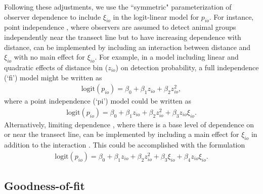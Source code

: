 \documentclass[aoas,preprint]{imsart}
\numberwithin{equation}{section}
\theoremstyle{plain}
\begin{document}
Following these adjustments, we use the ``symmetric" parameterization \citep{MacKenzieClement2016} of observer dependence to include $\xi_{io}$ in the logit-linear model for $p_{io}$.  For instance, point independence \citep{LaakeBorchers2004,BucklandEtAl2010}, where observers are assumed to detect animal groups independently near the transect line but to have increasing dependence with distance, can be implemented by including an interaction between distance and $\xi_{io}$ with no main effect for $\xi_{io}$.  For example, in a model including linear and quadratic effects of distance bin ($z_{io}$) on detection probability, a full independence (`fi') model might be written as 
\begin{eqnarray*}
  \text{logit}(p_{io})=\beta_0 + \beta_1 z_{io} + \beta_2 z_{io}^2,
\end{eqnarray*}
where a point independence (`pi') model could be written as
\begin{eqnarray*}
  \text{logit}(p_{io})=\beta_0 + \beta_1 z_{io} + \beta_2 z_{io}^2 + \beta_3 z_{io} \xi_{io}.
  \label{eq:pi_ex}
\end{eqnarray*}
Alternatively, limiting dependence \citep[`li'][]{BucklandEtAl2010}, where there is a base level of dependence on or near the transect line, can be implemented by including a main effect for $\xi_{io}$ in addition to the interaction \citep{MacKenzieClement2016}.  This could be accomplished with the formulation
\begin{eqnarray*}
  \text{logit}(p_{io})=\beta_0 + \beta_1 z_{io} + \beta_2 z_{io}^2 + \beta_3 \xi_{io} + \beta_4 z_{io} \xi_{io}.
\end{eqnarray*}

\subsection{Goodness-of-fit}
\end{document}
